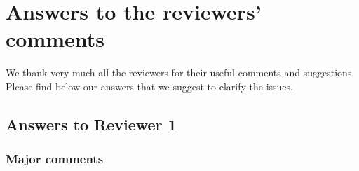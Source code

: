 \documentclass{article}%
\begin{document}
\section*{Answers to the reviewers' comments
}


We thank very much all the reviewers for their useful comments and suggestions.
Please find below our answers that we suggest to clarify the issues.


\subsection*{Answers to Reviewer 1}

\subsubsection*{Major comments}
\end{document}

